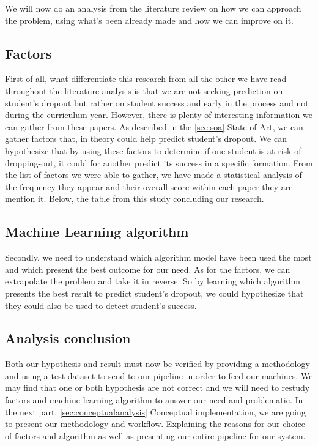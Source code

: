 \documentclass[../main.tex]{subfiles}
\begin{document}
We will now do an analysis from the literature review on how we can approach the problem, using what's been already made and how we can improve on it.

\subsection{Factors}
First of all, what differentiate this research from all the other we have read throughout the literature analysis is that we are not seeking prediction on student's dropout but rather on student success and early in the process and not during the curriculum year. However, there is plenty of interesting information we can gather from these papers. As described in the \ref{sec:soa} State of Art, we can gather factors that, in theory could help predict student's dropout. We can hypothesize that by using these factors to determine if one student is at risk of dropping-out, it could for another predict its success in a specific formation. From the list of factors we were able to gather, we have made a statistical analysis of the frequency they appear and their overall score within each paper they are mention it. Below, the table from this study concluding our research.

\subsection{Machine Learning algorithm}
Secondly, we need to understand which algorithm model have been used the most and which present the best outcome for our need. As for the factors, we can extrapolate the problem and take it in reverse. So by learning which algorithm presents the best result to predict student's dropout, we could hypothesize that they could also be used to detect student's success. 

\subsection{Analysis conclusion}
Both our hypothesis and result must now be verified by providing a methodology and using a test dataset to send to our pipeline in order to feed our machines.
We may find that one or both hypothesis are not correct and we will need to restudy factors and machine learning algorithm to answer our need and problematic. 
In the next part, \ref{sec:conceptualanalysis} Conceptual implementation, we are going to present our methodology and workflow. Explaining the reasons for our choice of factors and algorithm as well as presenting our entire pipeline for our system.
\end{document}
